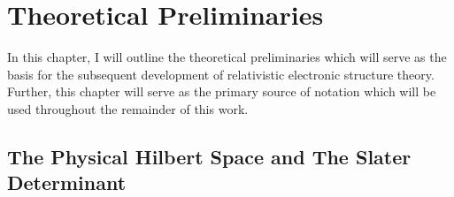 \chapter{Theoretical Preliminaries}
\label{ch:Theory}

In this chapter, I will outline the theoretical preliminaries which will serve as the basis
for the subsequent development of relativistic electronic structure theory. Further, this
chapter will serve as the primary source of notation which will be used throughout the
remainder of this work. 


\section{The Physical Hilbert Space and The Slater Determinant}
\label{sec:SD}


